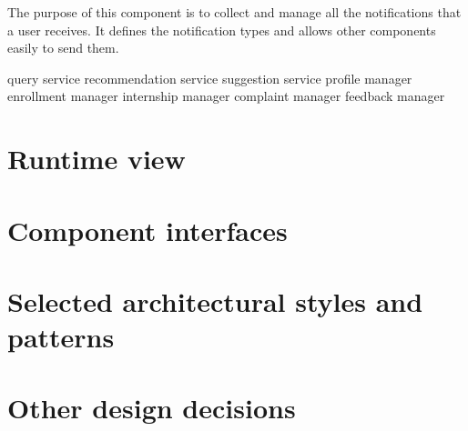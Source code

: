 The purpose of this component is to collect and manage all the notifications that a user receives.
It defines the notification types and allows other components easily to send them.

query service
recommendation service
suggestion service
profile manager
enrollment manager
internship manager
complaint manager
feedback manager

\section{Runtime view}
\section{Component interfaces}
\section{Selected architectural styles and patterns}
\section{Other design decisions}
